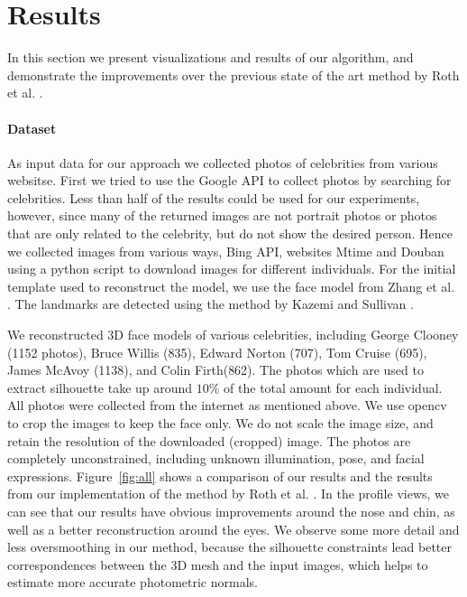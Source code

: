 \section{Results}
\label{sec:results}

In this section we present visualizations and results of our algorithm, and demonstrate the improvements over the previous state of the art method by Roth et al. \cite{Roth:2015:UFR}.

\paragraph*{Dataset} As input data for our approach we collected photos of celebrities from various websitse. First we tried to use the Google API to collect photos by searching for celebrities. Less than half of the results could be used for our experiments, however, since many of the returned images are not portrait photos or photos that are only related to the celebrity, but do not show the desired person. Hence we collected images from various ways, Bing API, websites Mtime and Douban using a python script to download images for different individuals. For the initial template used to reconstruct the model, we use the face model from Zhang et al. \cite{Zhang04}. The landmarks are detected using the method by Kazemi and Sullivan \cite{kazemi2014one}.

We reconstructed 3D face models of various celebrities, including George Clooney (1152 photos),  Bruce Willis (835), Edward Norton (707), Tom Cruise (695), James McAvoy (1138), and Colin Firth(862). The photos which are used to extract silhouette take up around $10\%$ of the total amount for each individual. All photos were collected from the internet as mentioned above. We use opencv to crop the images to keep the face only. We do not scale the image size, and retain the resolution of the downloaded (cropped) image. The photos are completely unconstrained, including unknown illumination, pose, and facial expressions. Figure~\ref{fig:all} shows a comparison of our results and the results from our implementation of the method by Roth et al. \cite{Roth:2015:UFR}. In the profile views, we can see that our results have obvious improvements around the nose and chin, as well as a better reconstruction around the eyes. We observe some more detail and less oversmoothing in our method, because the silhouette constraints lead better correspondences between the 3D mesh and the input images, which helps to estimate more accurate photometric normals.

